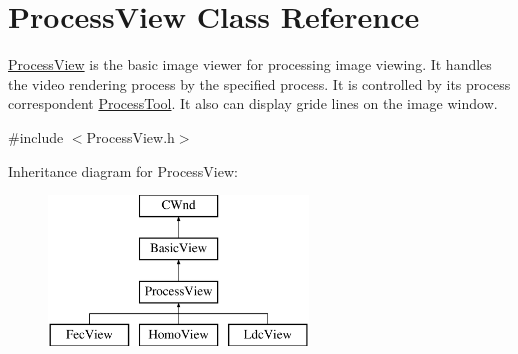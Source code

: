 \hypertarget{class_process_view}{}\section{Process\+View Class Reference}
\label{class_process_view}


\mbox{\hyperlink{class_process_view}{Process\+View}} is the basic image viewer for processing image viewing. It handles the video rendering process by the specified process. It is controlled by its process correspondent \mbox{\hyperlink{class_process_tool}{Process\+Tool}}. It also can display gride lines on the image window.  




{\ttfamily \#include $<$Process\+View.\+h$>$}

Inheritance diagram for Process\+View\+:\begin{figure}[H]
\begin{center}
\leavevmode
\includegraphics[height=4.000000cm]{class_process_view}
\end{center}
\end{figure}
